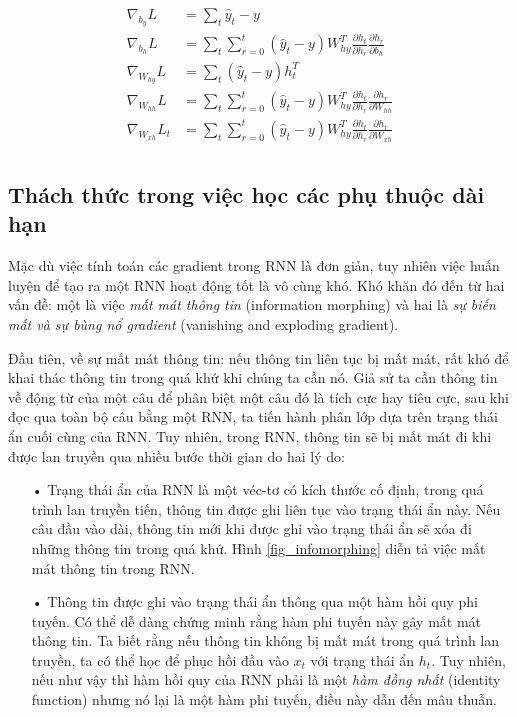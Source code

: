 \begin{align}
\nabla_{b_{y}}L &= \sum_{t} \hat{y}_t - y \\ \label{updateParams2} 
\nabla_{b_h}L &= \sum_{t} \sum_{r=0}^{t} (\hat{y}_t - y) W_{hy}^T \frac{\partial h_{t}}{\partial h_r} \frac{\partial h_r}{\partial b_h} \\ \label{updateParams3}
\nabla_{W_{hy}}L &= \sum_{t} (\hat{y}_t - y) h_t^T \\ \label{updateParams4}
\nabla_{W_{hh}}L &= \sum_{t} \sum_{r=0}^{t}  (\hat{y}_t - y) W_{hy}^T \frac{\partial h_{t}}{\partial h_r} \frac{\partial h_r}{\partial W_{hh}} \\ \label{updateParams5}
\nabla_{W_{xh}}L_t &= \sum_{t} \sum_{r=0}^{t} (\hat{y}_t - y) W_{hy}^T \frac{\partial h_{t}}{\partial h_r} \frac{\partial h_r}{\partial W_{xh}} \\ \label{updateParams6} \nonumber
\end{align}

\subsection{Thách thức trong việc học các phụ thuộc dài hạn}

Mặc dù việc tính toán các gradient trong RNN là đơn giản, tuy nhiên việc huấn luyện để tạo ra một RNN hoạt động tốt là vô cùng khó. Khó khăn đó đến từ hai vấn đề: một là việc \textit{mất mát thông tin} (information morphing) và hai là \textit{sự biến mất và sự bùng nổ gradient} (vanishing and exploding gradient).

Đầu tiên, về sự mất mát thông tin: nếu thông tin liên tục bị mất mát, rất khó để khai thác thông tin trong quá khứ khi chúng ta cần nó. Giả sử ta cần thông tin về động từ của một câu để phân biệt một câu đó là tích cực hay tiêu cực, sau khi đọc qua toàn bộ câu bằng một RNN, ta tiến hành phân lớp dựa trên trạng thái ẩn cuối cùng của RNN. Tuy nhiên, trong RNN, thông tin sẽ bị mất mát đi khi được lan truyền qua nhiều bước thời gian do hai lý do: 
\begin{itemize}
	\item[•] Trạng thái ẩn của RNN là một véc-tơ có kích thước cố định, trong quá trình lan truyền tiến, thông tin được ghi liên tục vào trạng thái ẩn này. Nếu câu đầu vào dài, thông tin mới khi được ghi vào trạng thái ẩn sẽ xóa đi những thông tin trong quá khứ. Hình \ref{fig_infomorphing} diễn tả việc mất mát thông tin trong RNN.
	\item[•] Thông tin được ghi vào trạng thái ẩn thông qua một hàm hồi quy phi tuyến. Có thể dễ dàng chứng minh rằng hàm phi tuyến này gây mất mát thông tin. Ta biết rằng nếu thông tin không bị mất mát trong quá trình lan truyền, ta có thể học để phục hồi đầu vào $x_t$ với trạng thái ẩn $h_t$. Tuy nhiên, nếu như vậy thì hàm hồi quy của RNN phải là một \textit{hàm đồng nhất} (identity function) nhưng nó lại là một hàm phi tuyến, điều này dẫn đến mâu thuẫn.
\end{itemize}

